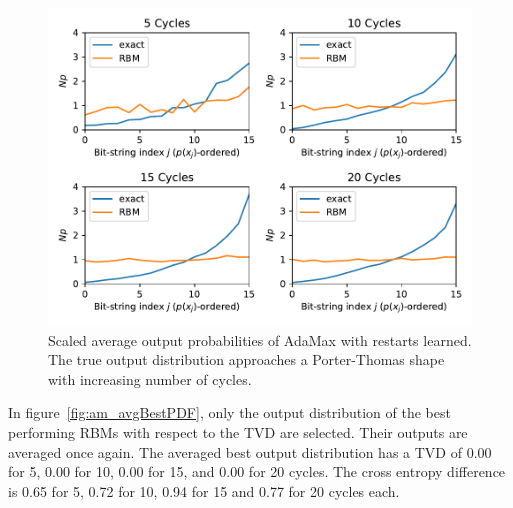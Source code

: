 \begin{figure}[H]
  \centering
  \includegraphics[width=\textwidth]{figures/results/AM-restarts-learned/avgPDF.pdf}
  \caption[Scaled Average Output Probabilities of All RBMs Trained with AdaMax with Random Restarts and $CZ$ Gates Learned]{
    Scaled average output probabilities of AdaMax with restarts learned. The true 
    output distribution approaches a Porter-Thomas shape with increasing number of cycles.}
  \label{fig:am_avgPDF}
\end{figure}

In figure~\ref{fig:am_avgBestPDF}, only the output distribution of the best performing RBMs with respect to the 
TVD are selected. Their outputs are averaged once again. The averaged best output distribution 
has a TVD of 0.00 for 5, 0.00 for 10, 0.00 for 15, and 0.00 for 20 
cycles. The cross entropy difference is 0.65 for 5, 0.72 for 10, 0.94 for 15 and 0.77 for 20 cycles each. 

